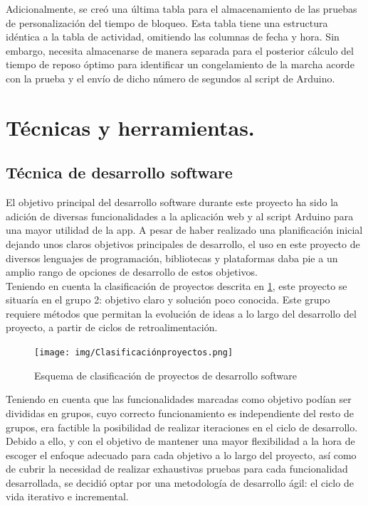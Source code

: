 Adicionalmente, se creó una última tabla para el almacenamiento de las pruebas de personalización del tiempo de bloqueo. Esta tabla tiene una estructura idéntica a la tabla de actividad, omitiendo las columnas de fecha y hora. Sin embargo, necesita almacenarse de manera separada para el posterior cálculo del tiempo de reposo óptimo para identificar un congelamiento de la marcha acorde con la prueba y el envío de dicho número de segundos al script de Arduino.

 
\section{Técnicas y herramientas.}
\subsection{Técnica de desarrollo software}
El objetivo principal del desarrollo software durante este proyecto ha sido la adición de diversas funcionalidades a la aplicación web y al script Arduino para una mayor utilidad de la app. A pesar de haber realizado una planificación inicial dejando unos claros objetivos principales de desarrollo, el uso en este proyecto de diversos lenguajes de programación, bibliotecas y plataformas daba pie a un amplio rango de opciones de desarrollo de estos objetivos. \\
Teniendo en cuenta la clasificación de proyectos descrita en \ref{fig:clasificacionproyectos}, este proyecto se situaría en el grupo 2: objetivo claro y solución poco conocida. Este grupo requiere métodos que permitan la evolución de ideas a lo largo del desarrollo del proyecto, a partir de ciclos de retroalimentación.\cite{Pradel2013}\\
\begin{figure}[h]
    \centering
    \texttt{[image: img/Clasificaciónproyectos.png]}
    \caption{Esquema de clasificación de proyectos de desarrollo software \cite{Pradel2013}}
    \label{fig:clasificacionproyectos}
\end{figure}
Teniendo en cuenta que las funcionalidades marcadas como objetivo podían ser divididas en grupos, cuyo correcto funcionamiento es independiente del resto de grupos, era factible la posibilidad de realizar iteraciones en el ciclo de desarrollo.\\
Debido a ello, y con el objetivo de mantener una mayor flexibilidad a la hora de escoger el enfoque adecuado para cada objetivo a lo largo del proyecto, así como de cubrir la necesidad de realizar exhaustivas pruebas para cada funcionalidad desarrollada, se decidió optar por una metodología de desarrollo ágil: el ciclo de vida iterativo e incremental.
